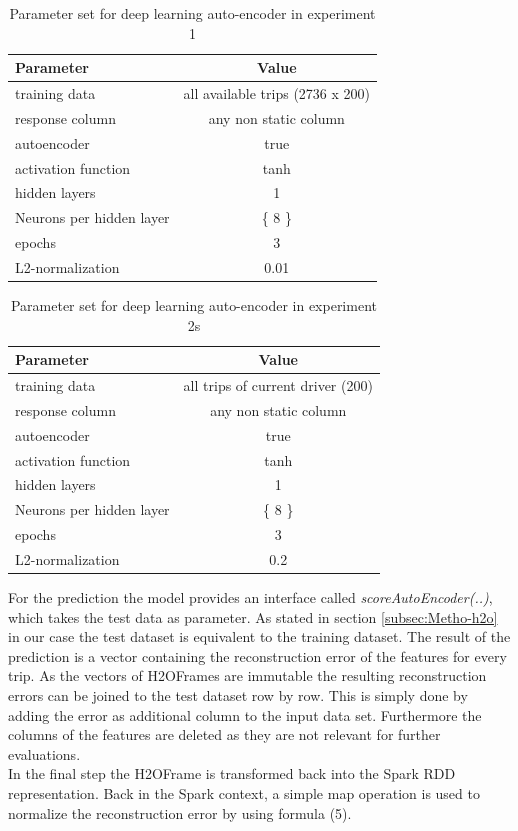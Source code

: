 \documentclass{vldb}
\begin{document}
\begin{table}
\centering
\begin{tabular}{l | c}
Parameter            & Value\\ \hline
training data        & all available trips (2736 x 200) \\
response column      & any non static column \\
autoencoder          & true \\
activation function  & tanh \\
hidden layers       & 1 \\
Neurons per hidden layer        & \{ 8 \}\\
epochs               & 3\\
L2-normalization     & 0.01
\end{tabular}
\caption{Parameter set for deep learning auto-encoder in experiment 1}
\label{table:param-set-exp1}
\end{table}

\begin{table}
\centering
\begin{tabular}{l | c}
Parameter            & Value\\ \hline
training data        & all trips of current driver (200) \\
response column      & any non static column \\
autoencoder          & true \\
activation function  & tanh \\
hidden layers       & 1 \\
Neurons per hidden layer        & \{ 8 \}\\
epochs               & 3\\
L2-normalization     & 0.2
\end{tabular}
\caption{Parameter set for deep learning auto-encoder in experiment 2s}
\label{table:param-set-exp2}
\end{table}

For the prediction the model provides an interface called \textit{scoreAutoEncoder(..)}, which takes the test data as parameter. As stated in section \ref{subsec:Metho-h2o} in our case the test dataset is equivalent to the training dataset. The result of the prediction is a vector containing the reconstruction error of the features for every trip. As the vectors of H2OFrames are immutable the resulting reconstruction errors can be joined to the test dataset row by row. This is simply done by adding the error as additional column to the input data set. Furthermore the columns of the features are deleted as they are not relevant for further evaluations. \\
In the final step the H2OFrame is transformed back into the Spark RDD representation. Back in the Spark context,  a simple map operation is used to  normalize the reconstruction error by using formula (5).
\end{document}
